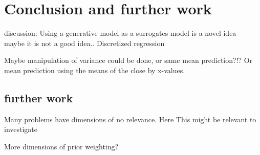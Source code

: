 \chapter{Conclusion and further work}

discussion: Using a generative model as a surrogates model is a novel idea - maybe it is not a good
idea.. 
Discretized regression

Maybe manipulation of variance could be done, or same mean prediction?!? Or 
mean prediction using the means of the close by x-values. 

\section{further work}
Many problems have dimensions of no relevance. Here This might be relevant to investigate

More dimensions of prior weighting?